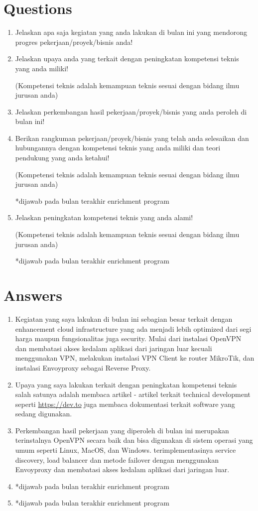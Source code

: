 \documentclass[12pt, letterpaper]{article}
\begin{document}
\section*{Questions}
\begin{enumerate}
    \item Jelaskan apa saja kegiatan yang anda lakukan di bulan ini yang mendorong progres pekerjaan/proyek/bisnis anda!
    \item Jelaskan upaya anda yang terkait dengan peningkatan kompetensi teknis yang anda miliki!
    
    (Kompetensi teknis adalah kemampuan teknis sesuai dengan bidang ilmu jurusan anda)
    \item Jelaskan perkembangan hasil pekerjaan/proyek/bisnis yang anda peroleh di bulan ini!
    \item Berikan rangkuman pekerjaan/proyek/bisnis yang telah anda selesaikan dan hubungannya dengan kompetensi teknis yang anda miliki dan teori pendukung yang anda ketahui!
    
    (Kompetensi teknis adalah kemampuan teknis sesuai dengan bidang ilmu jurusan anda)

    *dijawab pada bulan terakhir enrichment program
    \item Jelaskan peningkatan kompetensi teknis yang anda alami!
    
    (Kompetensi teknis adalah kemampuan teknis sesuai dengan bidang ilmu jurusan anda)
    
    *dijawab pada bulan terakhir enrichment program
\end{enumerate}

\section*{Answers}
\begin{enumerate}
    \item Kegiatan yang saya lakukan di bulan ini sebagian besar terkait dengan enhancement cloud infrastructure yang ada menjadi lebih optimized dari segi harga maupun fungsionalitas juga security. Mulai dari instalasi OpenVPN dan membatasi akses kedalam aplikasi dari jaringan luar kecuali menggunakan VPN, melakukan instalasi VPN Client ke router MikroTik, dan instalasi Envoyproxy sebagai Reverse Proxy.
    \item Upaya yang saya lakukan terkait dengan peningkatan kompetensi teknis salah satunya adalah membaca artikel - artikel terkait technical development seperti \url{https://dev.to} juga membaca dokumentasi terkait software yang sedang digunakan.
    \item Perkembangan hasil pekerjaan yang diperoleh di bulan ini merupakan terinstalnya OpenVPN secara baik dan bisa digunakan di sistem operasi yang umum seperti Linux, MacOS, dan Windows. terimplementasinya service discovery, load balancer dan metode failover dengan menggunakan Envoyproxy dan membatasi akses kedalam aplikasi dari jaringan luar.
    \item *dijawab pada bulan terakhir enrichment program
    \item *dijawab pada bulan terakhir enrichment program
\end{enumerate}
\end{document}
